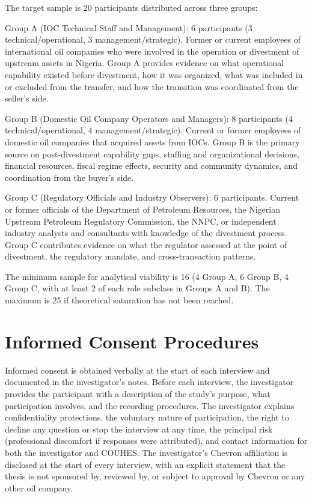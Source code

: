 \documentclass[twoside,fontset=lmodern]{mitthesis}
\begin{document}
The target sample is 20 participants distributed across three groups:

Group A (IOC Technical Staff and Management): 6 participants (3
technical/operational, 3 management/strategic). Former or current
employees of international oil companies who were involved in the
operation or divestment of upstream assets in Nigeria. Group A provides
evidence on what operational capability existed before divestment, how
it was organized, what was included in or excluded from the transfer,
and how the transition was coordinated from the seller's side.

Group B (Domestic Oil Company Operators and Managers): 8 participants (4
technical/operational, 4 management/strategic). Current or former
employees of domestic oil companies that acquired assets from IOCs.
Group B is the primary source on post-divestment capability gaps,
staffing and organizational decisions, financial resources, fiscal
regime effects, security and community dynamics, and coordination from
the buyer's side.

Group C (Regulatory Officials and Industry Observers): 6 participants.
Current or former officials of the Department of Petroleum Resources,
the Nigerian Upstream Petroleum Regulatory Commission, the NNPC, or
independent industry analysts and consultants with knowledge of the
divestment process. Group C contributes evidence on what the regulator
assessed at the point of divestment, the regulatory mandate, and
cross-transaction patterns.

The minimum sample for analytical viability is 16 (4 Group A, 6 Group B,
4 Group C, with at least 2 of each role subclass in Groups A and B). The
maximum is 25 if theoretical saturation has not been reached.

\hypertarget{informed-consent-procedures}{%
\section{Informed Consent
Procedures}\label{informed-consent-procedures}}

Informed consent is obtained verbally at the start of each interview and
documented in the investigator's notes. Before each interview, the
investigator provides the participant with a description of the study's
purpose, what participation involves, and the recording procedures. The
investigator explains confidentiality protections, the voluntary nature
of participation, the right to decline any question or stop the
interview at any time, the principal risk (professional discomfort if
responses were attributed), and contact information for both the
investigator and COUHES. The investigator's Chevron affiliation is
disclosed at the start of every interview, with an explicit statement
that the thesis is not sponsored by, reviewed by, or subject to approval
by Chevron or any other oil company.
\end{document}
